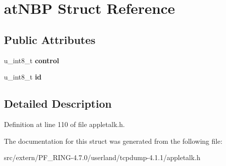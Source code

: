 \hypertarget{structat_n_b_p}{
\section{atNBP Struct Reference}
\label{structat_n_b_p}
}
\subsection*{Public Attributes}
\begin{DoxyCompactItemize}
\item 
\hypertarget{structat_n_b_p_adfb8a54894544cd26c832689e2241cd2}{
u\_\-int8\_\-t {\bfseries control}}
\label{structat_n_b_p_adfb8a54894544cd26c832689e2241cd2}

\item 
\hypertarget{structat_n_b_p_ab8b79b48cca3c6d31f7dafa8e2093a0c}{
u\_\-int8\_\-t {\bfseries id}}
\label{structat_n_b_p_ab8b79b48cca3c6d31f7dafa8e2093a0c}

\end{DoxyCompactItemize}


\subsection{Detailed Description}


Definition at line 110 of file appletalk.h.



The documentation for this struct was generated from the following file:\begin{DoxyCompactItemize}
\item 
src/extern/PF\_\-RING-\/4.7.0/userland/tcpdump-\/4.1.1/appletalk.h\end{DoxyCompactItemize}
